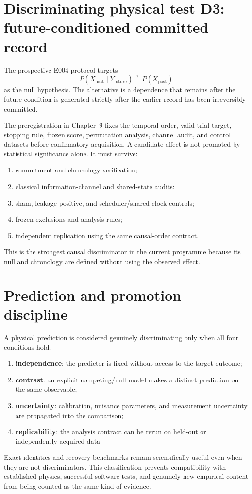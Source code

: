 \section{Discriminating physical test D3: future-conditioned committed record}

The prospective E004 protocol targets
\[
\boxed{
P(X_{\mathrm{past}}\mid Y_{\mathrm{future}})
\stackrel{?}{=}
P(X_{\mathrm{past}})
}
\]
as the null hypothesis. The alternative is a dependence that remains after the future condition is generated strictly after the earlier record has been irreversibly committed.

The preregistration in Chapter~9 fixes the temporal order, valid-trial target, stopping rule, frozen score, permutation analysis, channel audit, and control datasets before confirmatory acquisition. A candidate effect is not promoted by statistical significance alone. It must survive:
\begin{enumerate}
\item commitment and chronology verification;
\item classical information-channel and shared-state audits;
\item sham, leakage-positive, and scheduler/shared-clock controls;
\item frozen exclusions and analysis rules;
\item independent replication using the same causal-order contract.
\end{enumerate}
This is the strongest causal discriminator in the current programme because its null and chronology are defined without using the observed effect.

\section{Prediction and promotion discipline}

A physical prediction is considered genuinely discriminating only when all four conditions hold:
\begin{enumerate}
\item \textbf{independence}: the predictor is fixed without access to the target outcome;
\item \textbf{contrast}: an explicit competing/null model makes a distinct prediction on the same observable;
\item \textbf{uncertainty}: calibration, nuisance parameters, and measurement uncertainty are propagated into the comparison;
\item \textbf{replicability}: the analysis contract can be rerun on held-out or independently acquired data.
\end{enumerate}

Exact identities and recovery benchmarks remain scientifically useful even when they are not discriminators. This classification prevents compatibility with established physics, successful software tests, and genuinely new empirical content from being counted as the same kind of evidence.
